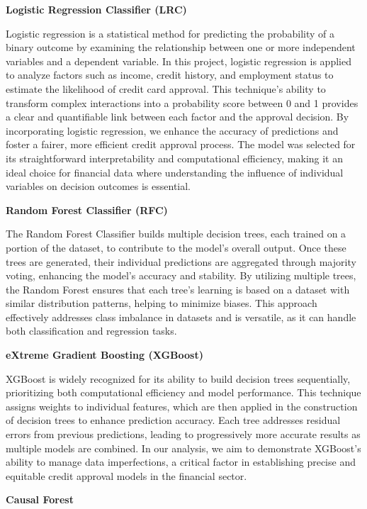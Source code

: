 \documentclass[12pt]{report}
\begin{document}
    {\bfseries Logistic Regression Classifier (LRC)}
    
    Logistic regression is a statistical method for predicting the probability of a binary outcome by examining the relationship between one or more independent variables and a dependent variable. In this project, logistic regression is applied to analyze factors such as income, credit history, and employment status to estimate the likelihood of credit card approval. This technique’s ability to transform complex interactions into a probability score between 0 and 1 provides a clear and quantifiable link between each factor and the approval decision. By incorporating logistic regression, we enhance the accuracy of predictions and foster a fairer, more efficient credit approval process. The model was selected for its straightforward interpretability and computational efficiency, making it an ideal choice for financial data where understanding the influence of individual variables on decision outcomes is essential.

    {\bfseries Random Forest Classifier (RFC)}
    
    The Random Forest Classifier builds multiple decision trees, each trained on a portion of the dataset, to contribute to the model's overall output. Once these trees are generated, their individual predictions are aggregated through majority voting, enhancing the model's accuracy and stability. By utilizing multiple trees, the Random Forest ensures that each tree's learning is based on a dataset with similar distribution patterns, helping to minimize biases. This approach effectively addresses class imbalance in datasets and is versatile, as it can handle both classification and regression tasks.

    {\bfseries eXtreme Gradient Boosting (XGBoost)}

    XGBoost is widely recognized for its ability to build decision trees sequentially, prioritizing both computational efficiency and model performance. This technique assigns weights to individual features, which are then applied in the construction of decision trees to enhance prediction accuracy. Each tree addresses residual errors from previous predictions, leading to progressively more accurate results as multiple models are combined.  In our analysis, we aim to demonstrate XGBoost's ability to manage data imperfections, a critical factor in establishing precise and equitable credit approval models in the financial sector.

    {\bfseries Causal Forest}
\end{document}
